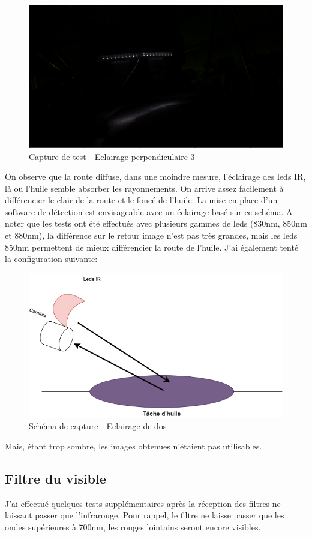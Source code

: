 \begin{figure}[H]
    \centering
    \includegraphics[width=13cm]{assets/figures/eclairage_perpendiculaire3.png}
    \caption{Capture de test - Eclairage perpendiculaire 3}
\end{figure}
On observe que la route diffuse, dans une moindre mesure, l'éclairage des leds IR, là ou l'huile semble absorber les rayonnements. On arrive
assez facilement à différencier le clair de la route et le foncé de l'huile. La mise en place d'un software de détection est envisageable avec
un éclairage basé sur ce schéma. A noter que les tests ont été effectués avec plusieurs gammes de leds (830nm, 850nm et 880nm), la différence
sur le retour image n'est pas très grandes, mais les leds 850nm permettent de mieux différencier la route de l'huile.
\newpage
J'ai également tenté la configuration suivante:
\begin{figure}[H]
    \centering
    \includegraphics[width=13cm]{assets/figures/eclairage_dos.png}
    \caption{Schéma de capture - Eclairage de dos}
\end{figure}
Mais, étant trop sombre, les images obtenues n'étaient pas utilisables.
\subsection{Filtre du visible}
J'ai effectué quelques tests supplémentaires après la réception des filtres ne laissant passer que l'infrarouge. Pour rappel, le filtre
ne laisse passer que les ondes supérieures à 700nm, les rouges lointains seront encore visibles.

